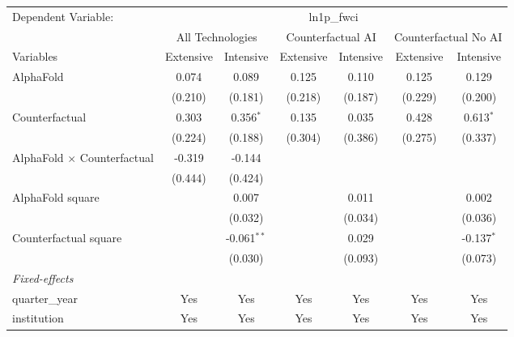 \begingroup
\centering
\begin{tabular}{lcccccc}
   \tabularnewline \midrule \midrule
   Dependent Variable: & \multicolumn{6}{c}{ln1p\_fwci}\\
 & \multicolumn{2}{c}{All Technologies} & \multicolumn{2}{c}{Counterfactual AI} & \multicolumn{2}{c}{Counterfactual No AI} \\
\cmidrule(lr){1-1}\cmidrule(lr){2-3} \cmidrule(lr){4-5} \cmidrule(lr){6-7}
Variables & \multicolumn{1}{c}{Extensive} & \multicolumn{1}{c}{Intensive} & \multicolumn{1}{c}{Extensive} & \multicolumn{1}{c}{Intensive} & \multicolumn{1}{c}{Extensive} & \multicolumn{1}{c}{Intensive} \\
\cmidrule(lr){1-1}\cmidrule(lr){2-2} \cmidrule(lr){3-3} \cmidrule(lr){4-4} \cmidrule(lr){5-5} \cmidrule(lr){6-6} \cmidrule(lr){7-7}
   AlphaFold                          & 0.074   & 0.089         & 0.125   & 0.110   & 0.125   & 0.129\\   
                                      & (0.210) & (0.181)       & (0.218) & (0.187) & (0.229) & (0.200)\\   
   Counterfactual                     & 0.303   & 0.356$^{*}$   & 0.135   & 0.035   & 0.428   & 0.613$^{*}$\\   
                                      & (0.224) & (0.188)       & (0.304) & (0.386) & (0.275) & (0.337)\\   
   AlphaFold $\times$ Counterfactual  & -0.319  & -0.144        &         &         &         &   \\   
                                      & (0.444) & (0.424)       &         &         &         &   \\   
   AlphaFold square                   &         & 0.007         &         & 0.011   &         & 0.002\\   
                                      &         & (0.032)       &         & (0.034) &         & (0.036)\\   
   Counterfactual square              &         & -0.061$^{**}$ &         & 0.029   &         & -0.137$^{*}$\\   
                                      &         & (0.030)       &         & (0.093) &         & (0.073)\\   
   \midrule
   \emph{Fixed-effects}\\
   quarter\_year                      & Yes     & Yes           & Yes     & Yes     & Yes     & Yes\\  
   institution                        & Yes     & Yes           & Yes     & Yes     & Yes     & Yes\\  

\end{tabular}
